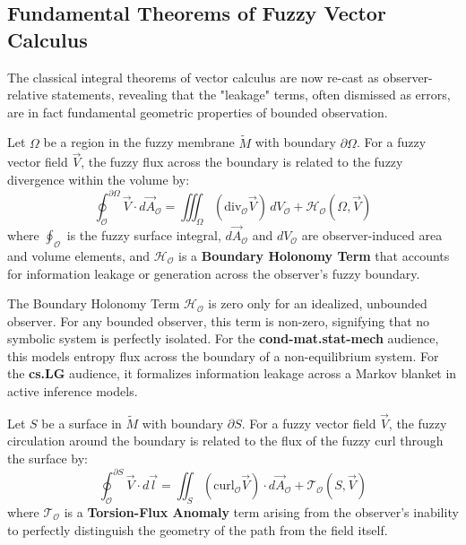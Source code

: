 \subsection{Fundamental Theorems of Fuzzy Vector Calculus}
\label{subsec:bk4_fuzzy_vector_calculus_theorems}

The classical integral theorems of vector calculus are now re-cast as observer-relative statements, revealing that the "leakage" terms, often dismissed as errors, are in fact fundamental geometric properties of bounded observation.

\begin{theorem}
\label{theorem:bk4_fuzzy_divergence_theorem}
Let $\Omega$ be a region in the fuzzy membrane $\tilde{M}$ with boundary $\partial\Omega$. For a fuzzy vector field $\vec{V}$, the fuzzy flux across the boundary is related to the fuzzy divergence within the volume by:
\[
\oint_{\mathcal{O}}^{\partial\Omega} \vec{V} \cdot d\vec{A}_{\mathcal{O}} = \iiint_{\Omega} (\text{div}_{\mathcal{O}} \vec{V}) \, dV_{\mathcal{O}} + \mathcal{H}_{\mathcal{O}}(\Omega, \vec{V})
\]
where $\oint_{\mathcal{O}}$ is the fuzzy surface integral, $d\vec{A}_{\mathcal{O}}$ and $dV_{\mathcal{O}}$ are observer-induced area and volume elements, and $\mathcal{H}_{\mathcal{O}}$ is a \textbf{Boundary Holonomy Term} that accounts for information leakage or generation across the observer's fuzzy boundary.
\end{theorem}

\begin{scholium}
\label{scholium:bk4_zero_is_idealized_in_boundedness}
The Boundary Holonomy Term $\mathcal{H}_{\mathcal{O}}$ is zero only for an idealized, unbounded observer. For any bounded observer, this term is non-zero, signifying that no symbolic system is perfectly isolated. For the \textbf{cond-mat.stat-mech} audience, this models entropy flux across the boundary of a non-equilibrium system. For the \textbf{cs.LG} audience, it formalizes information leakage across a Markov blanket in active inference models.
\end{scholium}

\begin{theorem}
\label{theorem:bk4_fuzzy_curl_theorem}
Let $S$ be a surface in $\tilde{M}$ with boundary $\partial S$. For a fuzzy vector field $\vec{V}$, the fuzzy circulation around the boundary is related to the flux of the fuzzy curl through the surface by:
\[
\oint_{\mathcal{O}}^{\partial S} \vec{V} \cdot d\vec{l} = \iint_{S} (\text{curl}_{\mathcal{O}} \vec{V}) \cdot d\vec{A}_{\mathcal{O}} + \mathcal{T}_{\mathcal{O}}(S, \vec{V})
\]
where $\mathcal{T}_{\mathcal{O}}$ is a \textbf{Torsion-Flux Anomaly} term arising from the observer's inability to perfectly distinguish the geometry of the path from the field itself.
\end{theorem}


